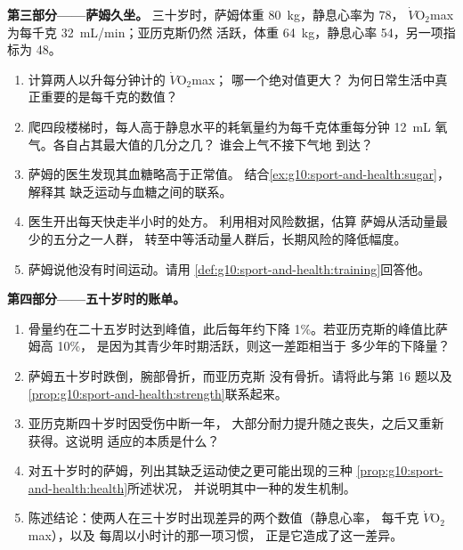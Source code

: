 \begin{problem}
\medskip
\noindent\textbf{第三部分——萨姆久坐。}
三十岁时，萨姆体重 \qty{80}{kg}，静息心率为 78，
$\dot V\!\mathrm{O_2}$max 为每千克 \qty{32}{mL/min}；亚历克斯仍然
活跃，体重 \qty{64}{kg}，静息心率 54，另一项指标为 \num{48}。
\begin{enumerate}[resume]
  \item 计算两人以升每分钟计的 $\dot V\!\mathrm{O_2}$max；
        哪一个绝对值更大？
        为何日常生活中真正重要的是每千克的数值？
  \item 爬四段楼梯时，每人高于静息水平的耗氧量约为每千克体重每分钟
        \qty{12}{mL} 氧气。各自占其最大值的几分之几？
        谁会上气不接下气地
        到达？
  \item 萨姆的医生发现其血糖略高于正常值。
        结合\cref{ex:g10:sport-and-health:sugar}，解释其
        缺乏运动与血糖之间的联系。
  \item 医生开出每天快走半小时的处方。
        利用相对风险数据，估算
        萨姆从活动量最少的五分之一人群，
        转至中等活动量人群后，长期风险的降低幅度。
  \item 萨姆说他没有时间运动。请用
        \cref{def:g10:sport-and-health:training}回答他。
\end{enumerate}

\medskip
\noindent\textbf{第四部分——五十岁时的账单。}
\begin{enumerate}[resume]
  \item 骨量约在二十五岁时达到峰值，此后每年约下降
        1\%。若亚历克斯的峰值比萨姆高 10\%，
        是因为其青少年时期活跃，则这一差距相当于
        多少年的下降量？
  \item 萨姆五十岁时跌倒，腕部骨折，而亚历克斯
        没有骨折。请将此与第 16 题以及
        \cref{prop:g10:sport-and-health:strength}联系起来。
  \item 亚历克斯四十岁时因受伤中断一年，
        大部分耐力提升随之丧失，之后又重新获得。这说明
        适应的本质是什么？
  \item 对五十岁时的萨姆，列出其缺乏运动使之更可能出现的三种
        \cref{prop:g10:sport-and-health:health}所述状况，
        并说明其中一种的发生机制。
  \item 陈述结论：使两人在三十岁时出现差异的两个数值（静息心率，
        每千克 $\dot V\!\mathrm{O_2}$max），以及
        每周以小时计的那一项习惯，
        正是它造成了这一差异。
\end{enumerate}
\end{problem}
